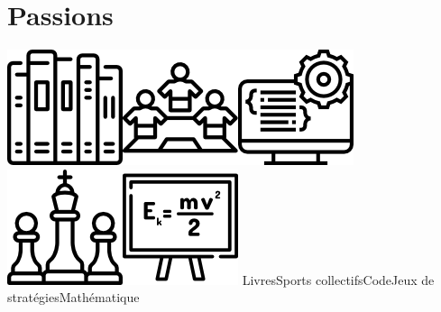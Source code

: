 \documentclass[]{friggeri-cv}
\begin{document}
\section{Passions}
\includegraphics[scale=0.6]{img/books.png}\hspace{2.4 em}\includegraphics[scale=0.6]{img/team.png}\hspace{2.4 em}\includegraphics[scale=0.6]{img/programming.png}\hspace{2.4 em}\includegraphics[scale=0.6]{img/chess.png}\hspace{2.4 em}\includegraphics[scale=0.6]{img/formula.png}
\phantom{}\hspace{1.9 em}Livres\hspace{3.6 em}Sports collectifs\hspace{4 em}Code\hspace{3.2 em}Jeux de stratégies\hspace{1.4 em}Mathématique
\end{document}
